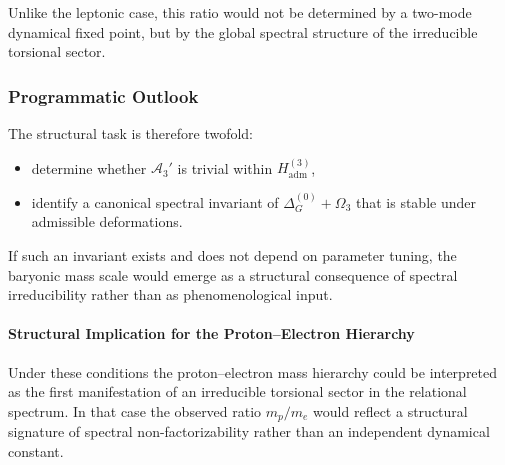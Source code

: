     Unlike the leptonic case,
    this ratio would not be determined by a two-mode dynamical fixed point,
    but by the global spectral structure of the irreducible torsional
    sector.

  \subsubsection*{Programmatic Outlook}

    The structural task is therefore twofold:

    \begin{itemize}
      \item[(i)] determine whether $\mathcal{A}_3'$ is trivial within
      $H_{\mathrm{adm}}^{(3)}$,
      \item[(ii)] identify a canonical spectral invariant of
      $\Delta^{(0)}_G+\Omega_3$ that is stable under admissible
      deformations.
    \end{itemize}

    If such an invariant exists and does not depend on parameter tuning,
    the baryonic mass scale would emerge as a structural consequence of
    spectral irreducibility rather than as phenomenological input.

    \paragraph*{Structural Implication for the Proton--Electron Hierarchy}

      Under these conditions the proton--electron mass hierarchy could be
      interpreted as the first manifestation of an irreducible torsional
      sector in the relational spectrum.
      In that case the observed ratio $m_p/m_e$ would reflect a structural
      signature of spectral non-factorizability rather than an independent
      dynamical constant.
